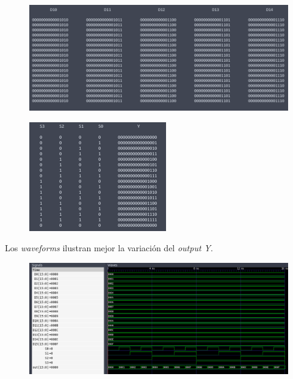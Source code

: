 \documentclass[11pt,a4paper]{article}
\begin{document}
\begin{enumerate}
\begin{enumerate}[label=(\alph*)]
\begin{figure}[h!]
\centering
\includegraphics[scale=0.7]{16_16x1MUX_63.png} 
\end{figure}

\begin{figure}[h!]
\centering
\includegraphics[scale=0.7]{16_16x1MUX_64.png} 
\end{figure}
\pagebreak
Los \textit{waveforms} ilustran mejor la variación del \textit{output Y}.
\begin{figure}[h!]
\centering
\includegraphics[scale=0.3]{16_16x1MUX_7.png} 
\end{figure}
\end{enumerate}


\end{enumerate}
\end{document}
